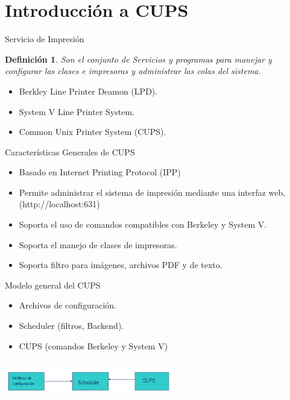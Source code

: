 \documentclass{beamer}
\begin{document}
\section{Introducci\'on a CUPS}
\begin{frame}{Servicio de Impresión}
\newtheorem{defi}{{\sc Definición}}
\begin{defi}
Son el conjunto de Servicios y programas para manejar y configurar las clases e impresoras y administrar las colas del sistema.
\end{defi}
\begin{itemize}
	\item Berkley Line Printer Deamon (LPD).
	\item System V Line Printer System.
	\item Common Unix Printer System (CUPS).
\end{itemize}
\end{frame}

\begin{frame}{Características Generales de CUPS}
	\begin{itemize}
		\item Basado en Internet Printing Protocol (IPP)
		\item Permite administrar el sistema de impresión mediante una interfaz web, (http://localhost:631)
		\item Soporta el uso de comandos compatibles con Berkeley y System V.
		\item Soporta el manejo de clases de impresoras.
		\item Soporta filtro para imágenes, archivos PDF y de texto.
	\end{itemize}
\end{frame}

\begin{frame}{Modelo general del CUPS}
\begin{itemize}
	\item Archivos de configuración.
	\item Scheduler (filtros, Backend).
	\item CUPS (comandos Berkeley  y System V)
\end{itemize}
\includegraphics[height=5em,width=20em]{cups.png} \hspace*{7.3cm}
\end{frame}
\end{document}
